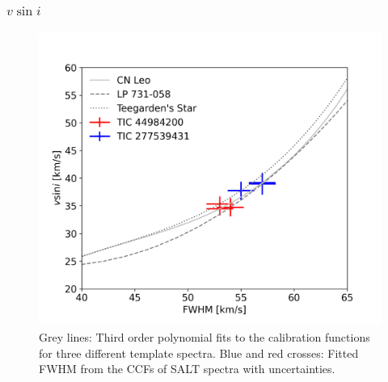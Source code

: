 \documentclass[fleqn,usenatbib,letters]{mnras}%
\begin{document}
\subsubsection{$v\sin i$}
\label{subsec:vsini}

\begin{figure}
	\includegraphics[width=\columnwidth]{figures/vsini.png}
    \caption{Grey lines: Third order polynomial fits to the calibration functions for three different template spectra. Blue and red crosses: Fitted FWHM from the CCFs of SALT spectra with uncertainties.}
    \label{fig:vsini}
\end{figure}
\end{document}

